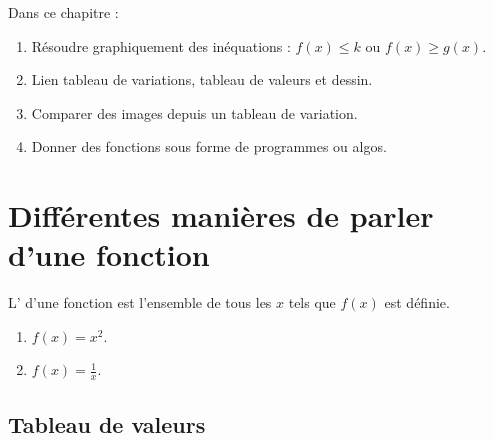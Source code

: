 
Dans ce chapitre :
\begin{enumerate}
    \item
        Résoudre graphiquement des inéquations : \( f(x)\leq k\) ou \( f(x)\geq g(x)\).
    \item
        Lien tableau de variations, tableau de valeurs et dessin.
    \item
        Comparer des images depuis un tableau de variation.
    \item
        Donner des fonctions sous forme de programmes ou algos.
\end{enumerate}

\section{Différentes manières de parler d'une fonction}

\begin{definition}
    L' d'une fonction est l'ensemble de tous les \( x\) tels que \( f(x)\) est définie.
\end{definition}

\begin{example}
    \begin{enumerate}
        \item
            \( f(x)=x^2\).
        \item
            \( f(x)=\frac{1}{ x }\).
    \end{enumerate}
\end{example}

\subsection{Tableau de valeurs}

